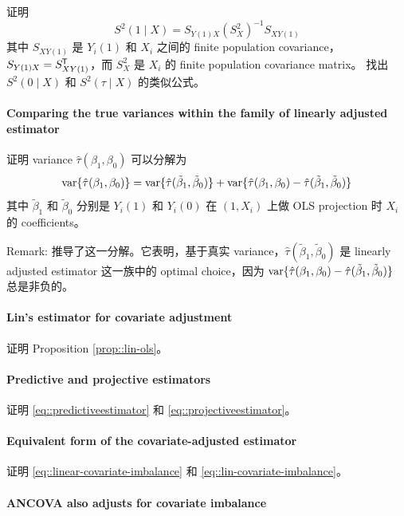 证明
$$
S^2(1\mid X) = S_{Y(1)X} (S_X^2)^{-1} S_{XY(1)}
$$
其中 $S_{XY(1)}$ 是 $Y_i(1)$ 和 $X_i$ 之间的 finite population covariance，$S_{Y(1)X} = S_{XY(1)}^{\mkern-1.5mu\mathsf{T}}$，而 $S_X^2$ 是 $X_i$ 的 finite population covariance matrix。
找出 $S^2(0\mid X) $ 和 $S^2(\tau\mid X) $ 的类似公式。

\paragraph{Comparing the true variances within the family of linearly adjusted estimator}\label{hw::compare-true-variance} 

证明 variance $\hat{\tau}(\beta_1, \beta_0)$ 可以分解为
$$
\textup{var}\{ \hat{\tau}(\beta_1, \beta_0) \} 
=  
\textup{var}\{ \hat{\tau}( \tilde{\beta}_1, \tilde{\beta}_0) \}  
+
\textup{var}\{ \hat{\tau}(\beta_1, \beta_0) - \hat{\tau}(\tilde{\beta}_1, \tilde{\beta}_0) \}
$$
其中 $\tilde{\beta}_1$ 和 $\tilde{\beta}_0$ 分别是 $Y_i(1)$ 和 $Y_i(0)$ 在 $(1, X_i)$ 上做 OLS projection 时 $X_i$ 的 coefficients。

Remark: \citet[][Example 9]{li2017general} 推导了这一分解。它表明，基于真实 variance，$\hat{\tau}( \tilde{\beta}_1, \tilde{\beta}_0)$ 是 linearly adjusted estimator 这一族中的 optimal choice，因为 $\textup{var}\{ \hat{\tau}(\beta_1, \beta_0) - \hat{\tau}(\tilde{\beta}_1, \tilde{\beta}_0) \}$ 总是非负的。

\paragraph{Lin's estimator for covariate adjustment}\label{para::lin-ols-covadj}

证明 Proposition \ref{prop::lin-ols}。

\paragraph{Predictive and projective estimators}\label{para::predictiveestimator}
证明 \eqref{eq::predictiveestimator} 和 \eqref{eq::projectiveestimator}。
 
 \paragraph{Equivalent form of the covariate-adjusted estimator}\label{para::reg-covariate-imbalance}

证明 \eqref{eq::linear-covariate-imbalance} 和 \eqref{eq::lin-covariate-imbalance}。
 
\paragraph{ANCOVA also adjusts for covariate imbalance}
\label{para::ancova-imbalance}


